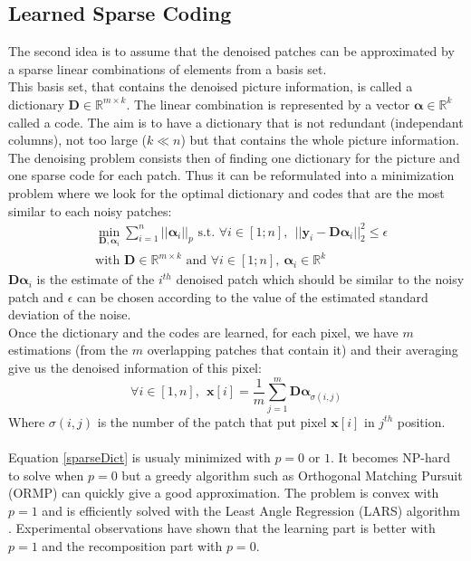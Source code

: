 \documentclass{ipol}
\newcommand{\psize}{m}
\newcommand{\dsize}{k}
\newcommand{\dict}{\textbf{D}}
\newcommand{\code}{\bm{\alpha}}
\newcommand{\pnorm}{p}
\newcommand{\denoi}{\textbf{x}}
\newcommand{\noi}{\textbf{y}}
\newcommand{\RR}{\mathbb{R}}
\begin{document}
\subsection{ Learned Sparse Coding}

The second idea is to assume that the denoised patches can be approximated by a sparse linear combinations of elements from a basis set.\\
This basis set, that contains the denoised picture information, is called a dictionary $\dict \in \RR^{\psize \times \dsize}$. The linear combination is represented by a vector $\code \in \RR^{\dsize}$ called a code.
The aim is to have a dictionary that is not redundant (independant columns), not too large ($\dsize \ll n$) but that contains the whole picture information.\\
The denoising problem consists then of finding one dictionary for the picture and one sparse code for each patch. Thus it can be reformulated into a minimization problem where we look for the optimal dictionary and codes that are the most similar to each noisy patches:
\begin{equation}
\begin{split}
	& \min_{\dict, \code_i} \sum_{i=1}^{n} ||\code_i||_\pnorm \text{ s.t. } \forall i \in [1;n],\ \ ||\noi_i  - \dict \code_i||^2_2 \leqslant \epsilon \\
	& \text{with } \dict \in \RR^{\psize \times \dsize} \text{ and } \forall i \in [1;n], \ \code_i \in \RR^\dsize
	\label{sparseDict}
\end{split}
\end{equation}
$\dict \code_i$ is the estimate of the $i^{th}$ denoised patch which should be similar to the noisy patch and $\epsilon$ can be chosen according to the value of the estimated standard deviation of the noise.\\
Once the dictionary and the codes are learned, for each pixel, we have $\psize$ estimations (from the $\psize$ overlapping patches that contain it) and their averaging give us the denoised information of this pixel:
\begin{equation}
	\forall i \in [1,n], \ \ \denoi[i] = \frac{1}{\psize} \sum_{j=1}^\psize \dict \code_{\sigma(i,j)}
\end{equation}
Where $\sigma(i,j)$ is the number of the patch that put pixel $\denoi[i]$ in $j^{th}$ position.\\
\\
Equation \eqref{sparseDict} is usualy minimized with $\pnorm = 0$ or $1$. It becomes NP-hard to solve when $\pnorm=0$ but a greedy algorithm such as Orthogonal Matching Pursuit (ORMP) \cite{OMP} can quickly give a good approximation. The problem is convex with $\pnorm=1$ and is efficiently solved with the Least Angle Regression (LARS) algorithm \cite{LARS}. Experimental observations \cite{l0l1} have shown that the learning part is better with $\pnorm=1$ and the recomposition part with $\pnorm=0$.\\
\end{document}
